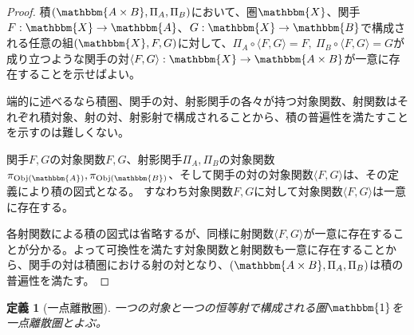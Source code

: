 \documentclass[dvipdfmx]{jsarticle}
\newcommand{\cat}[1]{\mathbbm{#1}}
\newcommand{\arrow}{\rightarrow}
\newcommand{\functor}[3]{#1:\cat{#2}\arrow \cat{#3}}
\newcommand{\tuple}[1]{\langle #1\rangle}
\newcommand{\obj}[1]{\mathrm{Obj}(\cat{#1})}
\newtheorem{proof}{証明}[section]
\newtheorem{define}{定義}[section]
\numberwithin{proof}{subsection}
\numberwithin{prop}{subsection}
\numberwithin{define}{subsection}
\begin{document}
	\begin{proof}
		積$(\cat{A\times B},\Pi_A,\Pi_B)$において、圏$\cat{X}$、関手$\functor{F}{X}{A}$、$\functor{G}{X}{B}$で構成される任意の組$(\cat{X},F,G)$に対して、$\Pi_A\circ\tuple{F,G}=F,\ \Pi_B\circ\tuple{F,G}=G$が成り立つような関手の対$\functor{\tuple{F,G}}{X}{A\times B}$が一意に存在することを示せばよい。
		\begin{center}
		\end{center}
		端的に述べるなら積圏、関手の対、射影関手の各々が持つ対象関数、射関数はそれぞれ積対象、射の対、射影射で構成されることから、積の普遍性を満たすことを示すのは難しくない。

		関手$F,G$の対象関数$F,G$、射影関手$\Pi_A,\Pi_B$の対象関数$\pi_{\obj{A}},\pi_{\obj{B}}$、そして関手の対の対象関数$\tuple{F,G}$は、その定義により積の図式となる。
		すなわち対象関数$F,G$に対して対象関数$\tuple{F,G}$は一意に存在する。
		\begin{center}
		\end{center}
		各射関数による積の図式は省略するが、同様に射関数$\tuple{F,G}$が一意に存在することが分かる。よって可換性を満たす対象関数と射関数も一意に存在することから、関手の対は積圏における射の対となり、$(\cat{A\times B},\Pi_A,\Pi_B)$は積の普遍性を満たす。
	\end{proof}
	\begin{define}[一点離散圏]
	一つの対象と一つの恒等射で構成される圏$\cat{1}$を一点離散圏とよぶ。
	\end{define}
\end{document}
